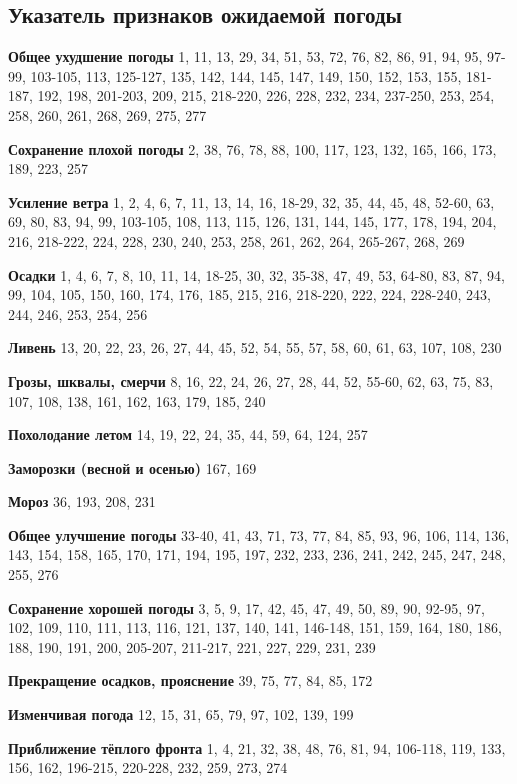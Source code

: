 \clearpage
\subsection{Указатель признаков ожидаемой погоды}
\textbf{Общее ухудшение погоды} 1, 11, 13, 29, 34, 51, 53, 72, 76, 82, 86, 91, 94, 95, 97-99, 103-105, 113, 125-127, 135, 142, 144, 145, 147, 149, 150, 152, 153, 155, 181-187, 192, 198, 201-203, 209, 215, 218-220, 226, 228, 232, 234, 237-250, 253, 254, 258, 260, 261, 268, 269, 275, 277

\textbf{Сохранение плохой погоды} 2, 38, 76, 78, 88, 100, 117, 123,
132, 165, 166, 173, 189, 223, 257

\textbf{Усиление ветра} 1, 2, 4, 6, 7, 11, 13, 14, 16, 18-29, 32, 35,
44, 45, 48, 52-60, 63, 69, 80, 83, 94, 99, 103-105, 108, 113, 115,
126, 131, 144, 145, 177, 178, 194, 204, 216, 218-222, 224, 228, 230,
240, 253, 258, 261, 262, 264, 265-267, 268, 269

\textbf{Осадки} 1, 4, 6, 7, 8, 10, 11, 14, 18-25, 30, 32, 35-38, 47,
49, 53, 64-80, 83, 87, 94, 99, 104, 105, 150, 160, 174, 176, 185, 215,
216, 218-220, 222, 224, 228-240, 243, 244, 246, 253, 254, 256

\textbf{Ливень} 13, 20, 22, 23, 26, 27, 44, 45, 52, 54, 55, 57, 58,
60, 61, 63, 107, 108, 230

\textbf{Грозы, шквалы, смерчи} 8, 16, 22, 24, 26, 27, 28, 44, 52,
55-60, 62, 63, 75, 83, 107, 108, 138, 161, 162, 163, 179, 185, 240

\textbf{Похолодание летом} 14, 19, 22, 24, 35, 44, 59, 64, 124, 257

\textbf{Заморозки (весной и осенью)} 167, 169

\textbf{Мороз} 36, 193, 208, 231

\textbf{Общее улучшение погоды} 33-40, 41, 43, 71, 73, 77, 84, 85, 93,
96, 106, 114, 136, 143, 154, 158, 165, 170, 171, 194, 195, 197, 232,
233, 236, 241, 242, 245, 247, 248, 255, 276

\textbf{Сохранение хорошей погоды} 3, 5, 9, 17, 42, 45, 47, 49, 50,
89, 90, 92-95, 97, 102, 109, 110, 111, 113, 116, 121, 137, 140, 141,
146-148, 151, 159, 164, 180, 186, 188, 190, 191, 200, 205-207,
211-217, 221, 227, 229, 231, 239

\textbf{Прекращение осадков, прояснение} 39, 75, 77, 84, 85, 172

\textbf{Изменчивая погода} 12, 15, 31, 65, 79, 97, 102, 139, 199

\textbf{Приближение тёплого фронта} 1, 4, 21, 32, 38, 48, 76, 81, 94,
106-118, 119, 133, 156, 162, 196-215, 220-228, 232, 259, 273, 274

